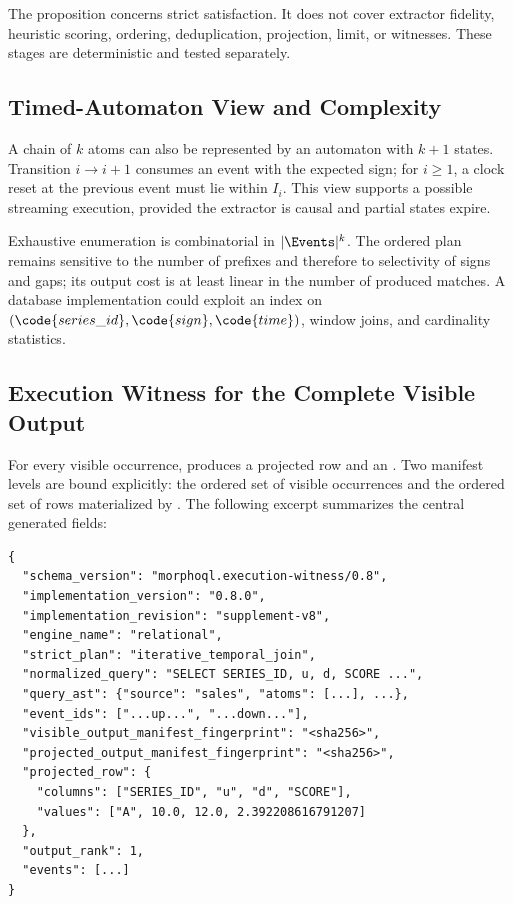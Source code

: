 The proposition concerns strict satisfaction. It does not cover extractor fidelity, heuristic scoring, ordering, deduplication, projection, limit, or witnesses. These stages are deterministic and tested separately.

\subsection{Timed-Automaton View and Complexity}

A chain of $k$ atoms can also be represented by an automaton with $k+1$ states. Transition $i\to i+1$ consumes an event with the expected sign; for $i\geq1$, a clock reset at the previous event must lie within $I_i$. This view supports a possible streaming execution, provided the extractor is causal and partial states expire.

Exhaustive enumeration is combinatorial in $|\Events|^k$. The ordered plan remains sensitive to the number of prefixes and therefore to selectivity of signs and gaps; its output cost is at least linear in the number of produced matches. A database implementation could exploit an index on $(\code{series\_id},\code{sign},\code{time})$, window joins, and cardinality statistics.

\subsection{Execution Witness for the Complete Visible Output}

For every visible occurrence,  produces a projected row and an . Two manifest levels are bound explicitly: the ordered set of visible occurrences and the ordered set of rows materialized by . The following excerpt summarizes the central generated fields:
\begin{lstlisting}[language={},basicstyle=\ttfamily\scriptsize]
{
  "schema_version": "morphoql.execution-witness/0.8",
  "implementation_version": "0.8.0",
  "implementation_revision": "supplement-v8",
  "engine_name": "relational",
  "strict_plan": "iterative_temporal_join",
  "normalized_query": "SELECT SERIES_ID, u, d, SCORE ...",
  "query_ast": {"source": "sales", "atoms": [...], ...},
  "event_ids": ["...up...", "...down..."],
  "visible_output_manifest_fingerprint": "<sha256>",
  "projected_output_manifest_fingerprint": "<sha256>",
  "projected_row": {
    "columns": ["SERIES_ID", "u", "d", "SCORE"],
    "values": ["A", 10.0, 12.0, 2.392208616791207]
  },
  "output_rank": 1,
  "events": [...]
}
\end{lstlisting}

